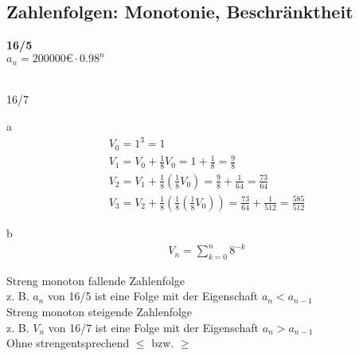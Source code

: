 \subsection{Zahlenfolgen: Monotonie, Beschränktheit}
\begin{onepage}
  \textbf{16/5}\\
  $a_n = 200000€ \cdot 0.98^n$ \\\\
\end{onepage}
\begin{exercise}{16/7}
  \item [a]
  \begin{gather*}
    V_0 = 1^3 = 1 \\
    V_1 = V_0 + \frac{1}{8} V_0 = 1 + \frac{1}{8} = \frac{9}{8} \\
    V_2 = V_1 + \frac{1}{8}(\frac{1}{8} V_0) = \frac{9}{8} + \frac{1}{64} = \frac{73}{64} \\
    V_3 = V_2 + \frac{1}{8}(\frac{1}{8}(\frac{1}{8} V_0)) = \frac{73}{64} + \frac{1}{512} = \frac{585}{512}
  \end{gather*}
  \item [b]
  \begin{gather*}
    V_n = \sum^n_{k = 0} 8^{-k}
  \end{gather*}
\end{exercise}
\begin{onepage}
  Streng monoton fallende Zahlenfolge \\
  \;z. B. $a_n$ von 16/5 ist eine Folge mit der Eigenschaft $a_n < a_{n - 1}$ \\
  Streng monoton steigende Zahlenfolge \\
  \;z. B. $V_n$ von 16/7 ist eine Folge mit der Eigenschaft $a_n > a_{n - 1}$ \\
  Ohne \glqq streng\grqq entsprechend $\leq$ bzw. $\geq$
\end{onepage} \\\\

